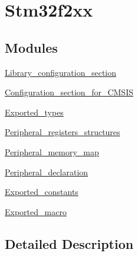 \hypertarget{group__stm32f2xx}{\section{Stm32f2xx}
\label{group__stm32f2xx}
}
\subsection*{Modules}
\begin{DoxyCompactItemize}
\item 
\hyperlink{group___library__configuration__section}{Library\-\_\-configuration\-\_\-section}
\item 
\hyperlink{group___configuration__section__for___c_m_s_i_s}{Configuration\-\_\-section\-\_\-for\-\_\-\-C\-M\-S\-I\-S}
\item 
\hyperlink{group___exported__types}{Exported\-\_\-types}
\item 
\hyperlink{group___peripheral__registers__structures}{Peripheral\-\_\-registers\-\_\-structures}
\item 
\hyperlink{group___peripheral__memory__map}{Peripheral\-\_\-memory\-\_\-map}
\item 
\hyperlink{group___peripheral__declaration}{Peripheral\-\_\-declaration}
\item 
\hyperlink{group___exported__constants}{Exported\-\_\-constants}
\item 
\hyperlink{group___exported__macro}{Exported\-\_\-macro}
\end{DoxyCompactItemize}


\subsection{Detailed Description}
